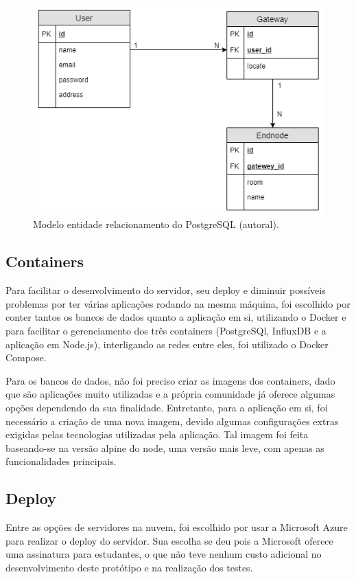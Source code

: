 \begin{figure}[H]
  \centering
  \includegraphics[width=.80\textwidth]{assets/postgres-model.png} 
  \caption{Modelo entidade relacionamento do PostgreSQL (autoral).}
  \label{fig:postgres-model} 
\end{figure}

\subsection{Containers}
\label{metod:servidor:containers}
Para facilitar o desenvolvimento do servidor, seu deploy e diminuir possíveis problemas por ter várias aplicações rodando na mesma máquina, foi escolhido por conter tantos os bancos de dados quanto a aplicação em si, utilizando o Docker e para facilitar o gerenciamento dos três containers (PostgreSQl, InfluxDB e a aplicação em Node.js), interligando as redes entre eles, foi utilizado o Docker Compose.

Para os bancos de dados, não foi preciso criar as imagens dos containers, dado que são aplicações muito utilizadas e a própria comunidade já oferece algumas opções dependendo da sua finalidade. Entretanto, para a aplicação em si, foi necessário a criação de uma nova imagem, devido algumas configurações extras exigidas pelas tecnologias utilizadas pela aplicação. Tal imagem foi feita baseando-se na versão alpine do node, uma versão mais leve, com apenas as funcionalidades principais.

\subsection{Deploy}
\label{metod:servidor:deploy}
Entre as opções de servidores na nuvem, foi escolhido por usar a Microsoft Azure para realizar o deploy do servidor. Sua escolha se deu pois a Microsoft oferece uma assinatura para estudantes, o que não teve nenhum custo adicional no desenvolvimento deste protótipo e na realização dos testes.

